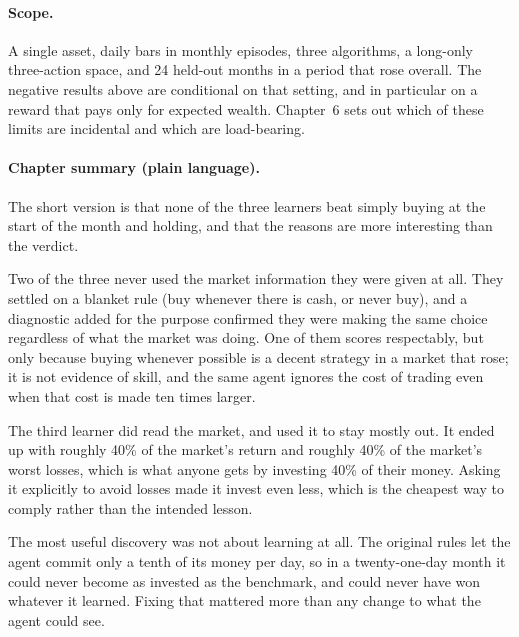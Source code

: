 \paragraph{Scope.} A single asset, daily bars in monthly episodes, three
algorithms, a long-only three-action space, and 24 held-out months in a period
that rose overall. The negative results above are conditional on that setting, and
in particular on a reward that pays only for expected wealth. Chapter~6 sets out
which of these limits are incidental and which are load-bearing.

\paragraph{Chapter summary (plain language).} The short version is that none of
the three learners beat simply buying at the start of the month and holding, and
that the reasons are more interesting than the verdict.

Two of the three never used the market information they were given at all. They
settled on a blanket rule (buy whenever there is cash, or never buy), and a
diagnostic added for the purpose confirmed they were making the same choice
regardless of what the market was doing. One of them scores respectably, but only
because buying whenever possible is a decent strategy in a market that rose; it
is not evidence of skill, and the same agent ignores the cost of trading even
when that cost is made ten times larger.

The third learner did read the market, and used it to stay mostly out. It ended
up with roughly 40\% of the market's return and roughly 40\% of the market's
worst losses, which is what anyone gets by investing 40\% of their money. Asking
it explicitly to avoid losses made it invest even less, which is the cheapest way
to comply rather than the intended lesson.

The most useful discovery was not about learning at all. The original rules let
the agent commit only a tenth of its money per day, so in a twenty-one-day month
it could never become as invested as the benchmark, and could never have won
whatever it learned. Fixing that mattered more than any change to what the agent
could see.
